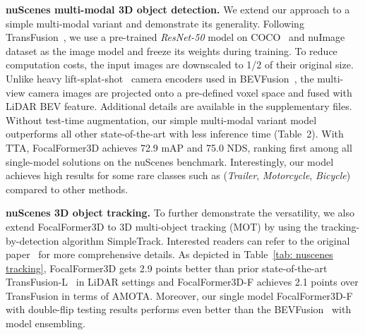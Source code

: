 \documentclass[10pt,twocolumn,letterpaper]{article}
\begin{document}
\vspace{2mm}
\noindent\textbf{nuScenes multi-modal 3D object detection.} We extend our approach to a simple multi-modal variant and demonstrate its generality. Following TransFusion~\cite{transfusion}, we use a pre-trained \textit{ResNet-50} model on COCO~\cite{coco} and nuImage~\cite{nuscenes} dataset as the image model and freeze its weights during training. To reduce computation costs, the input images are downscaled to 1/2 of their original size. Unlike heavy lift-splat-shot~\cite{liftsplatshoot} camera encoders used in BEVFusion~\cite{bevfusion, bevfusionmit}, the multi-view camera images are projected onto a pre-defined voxel space and fused with LiDAR BEV feature. Additional details are available in the supplementary files. Without test-time augmentation, our simple multi-modal variant model outperforms all other state-of-the-art with less inference time (Table~2). With TTA, FocalFormer3D achieves 72.9 mAP and 75.0 NDS, ranking first among all single-model solutions on the nuScenes benchmark. Interestingly, our model achieves high results for some rare classes such as (\textsl{Trailer}, \textsl{Motorcycle}, \textsl{Bicycle}) compared to other methods.

\vspace{2mm}
\noindent\textbf{nuScenes 3D object tracking.} 
To further demonstrate the versatility, we also extend FocalFormer3D to 3D multi-object tracking (MOT) by using the tracking-by-detection algorithm SimpleTrack. Interested readers can refer to the original paper~\cite{pang2021simpletrack} for more comprehensive details. As depicted in Table~\ref{tab: nuscenes tracking}, FocalFormer3D gets 2.9 points better than prior state-of-the-art TransFusion-L~\cite{transfusion} in LiDAR settings and FocalFormer3D-F achieves 2.1 points over TransFusion in terms of AMOTA. Moreover, our single model FocalFormer3D-F with double-flip testing results performs even better than the BEVFusion~\cite{bevfusionmit} with model ensembling.
\end{document}
